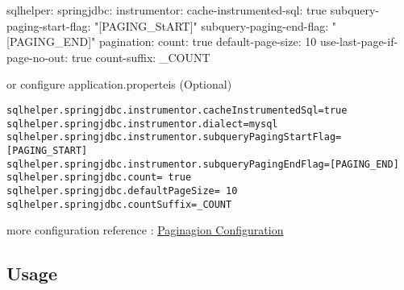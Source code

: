 \documentclass[
]{book}
\newenvironment{Shaded}{\begin{snugshade}}{\end{snugshade}}
\newcommand{\AttributeTok}[1]{\textcolor[rgb]{0.77,0.63,0.00}{#1}}
\newcommand{\CharTok}[1]{\textcolor[rgb]{0.31,0.60,0.02}{#1}}
\newcommand{\DecValTok}[1]{\textcolor[rgb]{0.00,0.00,0.81}{#1}}
\newcommand{\FunctionTok}[1]{\textcolor[rgb]{0.00,0.00,0.00}{#1}}
\newcommand{\StringTok}[1]{\textcolor[rgb]{0.31,0.60,0.02}{#1}}
\begin{document}
\begin{Shaded}
\begin{Highlighting}[]
\FunctionTok{sqlhelper:}
  \FunctionTok{springjdbc:}
    \FunctionTok{instrumentor:}
      \FunctionTok{cache-instrumented-sql:}\AttributeTok{ }\CharTok{true}
      \FunctionTok{subquery-paging-start-flag:}\AttributeTok{ }\StringTok{"[PAGING_StART]"}
      \FunctionTok{subquery-paging-end-flag:}\AttributeTok{ }\StringTok{"[PAGING_END]"}
    \FunctionTok{pagination:}
      \FunctionTok{count:}\AttributeTok{ }\CharTok{true}
      \FunctionTok{default-page-size:}\AttributeTok{ }\DecValTok{10}
      \FunctionTok{use-last-page-if-page-no-out:}\AttributeTok{ }\CharTok{true}
      \FunctionTok{count-suffix:}\AttributeTok{ _COUNT}
\end{Highlighting}
\end{Shaded}

or configure application.properteis (Optional)

\begin{verbatim}
sqlhelper.springjdbc.instrumentor.cacheInstrumentedSql=true
sqlhelper.springjdbc.instrumentor.dialect=mysql
sqlhelper.springjdbc.instrumentor.subqueryPagingStartFlag=[PAGING_START]
sqlhelper.springjdbc.instrumentor.subqueryPagingEndFlag=[PAGING_END]
sqlhelper.springjdbc.count= true
sqlhelper.springjdbc.defaultPageSize= 10
sqlhelper.springjdbc.countSuffix=_COUNT
\end{verbatim}

more configuration reference : \protect\hyperlink{pagination_configuration}{Paginagion Configuration}

\hypertarget{pagination_springjdbc_usage}{%
\subsection{Usage}\label{pagination_springjdbc_usage}}
\end{document}
